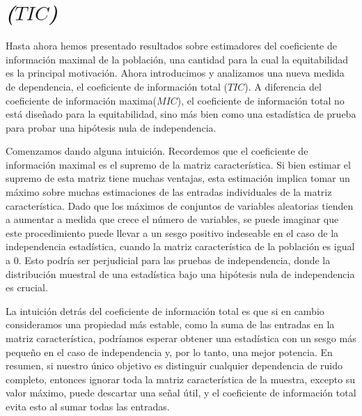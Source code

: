	\section{\textit{	 ($TIC$)}}
	Hasta ahora hemos presentado resultados sobre estimadores del coeficiente de informaci\'on maximal de la poblaci\'on, una cantidad para la cual la equitabilidad es la principal motivaci\'on. Ahora introducimos y analizamos una nueva medida de dependencia, el coeficiente de informaci\'on total ($TIC$). A diferencia del coeficiente de informaci\'on maxima($MIC$), el coeficiente de informaci\'on total no est\'a dise\~nado para la equitabilidad, sino m\'as bien como una estad\'istica de prueba para probar una hip\'otesis nula de independencia.

	Comenzamos dando alguna intuici\'on. Recordemos que el coeficiente de informaci\'on maximal es el supremo de la matriz caracter\'istica. Si bien estimar el supremo de esta matriz tiene muchas ventajas, esta estimaci\'on implica tomar un m\'aximo sobre muchas estimaciones de las entradas individuales de la matriz caracter\'istica. Dado que los m\'aximos de conjuntos de variables aleatorias tienden a aumentar a medida que crece el n\'umero de variables, se puede imaginar que este procedimiento puede llevar a un sesgo positivo indeseable en el caso de la independencia estad\'istica, cuando la matriz caracter\'istica de la poblaci\'on es igual a 0. Esto podr\'ia ser perjudicial para las pruebas de independencia, donde la distribuci\'on muestral de una estad\'istica bajo una hip\'otesis nula de independencia es crucial.
	
	La intuici\'on detr\'as del coeficiente de informaci\'on total es que si en cambio consideramos una propiedad m\'as estable, como la suma de las entradas en la matriz caracter\'istica, podr\'iamos esperar obtener una estad\'istica con un sesgo m\'as peque\~no en el caso de independencia y, por lo tanto, una mejor potencia. En resumen, si nuestro \'unico objetivo es distinguir cualquier dependencia de ruido completo, entonces ignorar toda la matriz caracter\'istica de la muestra, excepto su valor m\'aximo, puede descartar una se\~nal \'util, y el coeficiente de informaci\'on total evita esto al sumar todas las entradas.
	

